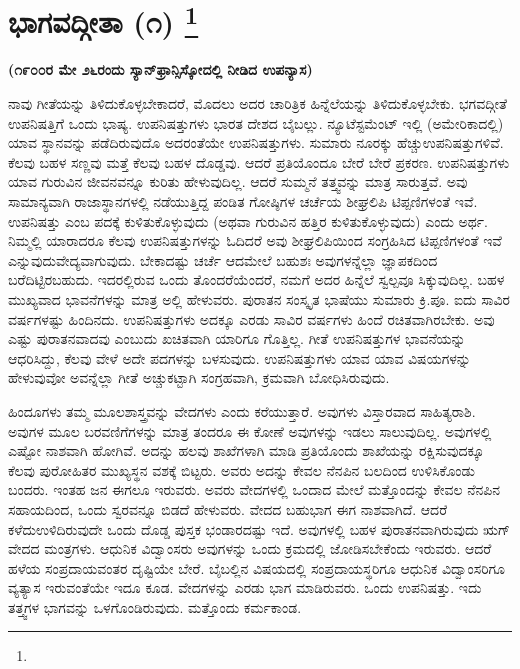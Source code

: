 
\chapter[ಭಾಗವದ್ಗೀತಾ (೧) ]{ಭಾಗವದ್ಗೀತಾ (೧) \protect\footnote{}}

\centerline{\textbf{(೧೯೦೦ರ ಮೇ ೨೬ರಂದು ಸ್ಯಾನ್​ಫ್ರಾನ್ಸಿಸ್ಕೋದಲ್ಲಿ ನೀಡಿದ ಉಪನ್ಯಾಸ)}}

ನಾವು ಗೀತೆಯನ್ನು ತಿಳಿದುಕೊಳ್ಳಬೇಕಾದರೆ, ಮೊದಲು ಅದರ ಚಾರಿತ್ರಿಕ ಹಿನ್ನೆಲೆಯನ್ನು ತಿಳಿದುಕೊಳ್ಳಬೇಕು. ಭಗವದ್ಗೀತೆ ಉಪನಿಷತ್ತಿಗೆ ಒಂದು ಭಾಷ್ಯ. ಉಪನಿಷತ್ತುಗಳು ಭಾರತ ದೇಶದ ಬೈಬಲ್ಲು. ನ್ಯೂಟೆಸ್ಟಮೆಂಟ್​ ಇಲ್ಲಿ (ಅಮೇರಿಕಾದಲ್ಲಿ) ಯಾವ ಸ್ಥಾನವನ್ನು ಪಡೆದಿರುವುದೊ ಅದರಂತೆಯೇ ಉಪನಿಷತ್ತುಗಳು. ಸುಮಾರು ನೂರಕ್ಕು ಹೆಚ್ಚು\break ಉಪನಿಷತ್ತುಗಳಿವೆ. ಕೆಲವು ಬಹಳ ಸಣ್ಣವು ಮತ್ತೆ ಕೆಲವು ಬಹಳ ದೊಡ್ಡವು. ಆದರೆ ಪ್ರತಿಯೊಂದೂ ಬೇರೆ ಬೇರೆ ಪ್ರಕರಣ. ಉಪನಿಷತ್ತುಗಳು ಯಾವ ಗುರುವಿನ ಜೀವನವನ್ನೂ ಕುರಿತು ಹೇಳುವುದಿಲ್ಲ. ಆದರೆ ಸುಮ್ಮನೆ ತತ್ತ್ವವನ್ನು ಮಾತ್ರ ಸಾರುತ್ತವೆ. ಅವು ಸಾಮಾನ್ಯವಾಗಿ ರಾಜಾಸ್ಥಾನಗಳಲ್ಲಿ ನಡೆಯುತ್ತಿದ್ದ ಪಂಡಿತ ಗೋಷ್ಠಿಗಳ ಚರ್ಚೆಯ ಶೀಘ್ರಲಿಪಿ ಟಿಪ್ಪಣಿಗಳಂತೆ ಇವೆ. ಉಪನಿಷತ್ತು ಎಂಬ ಪದಕ್ಕೆ ಕುಳಿತುಕೊಳ್ಳುವುದು (ಅಥವಾ ಗುರುವಿನ ಹತ್ತಿರ ಕುಳಿತುಕೊಳ್ಳುವುದು) ಎಂದು ಅರ್ಥ. ನಿಮ್ಮಲ್ಲಿ ಯಾರಾದರೂ ಕೆಲವು ಉಪನಿಷತ್ತುಗಳನ್ನು ಓದಿದರೆ ಅವು ಶೀಘ್ರಲಿಪಿಯಿಂದ ಸಂಗ್ರಹಿಸಿದ ಟಿಪ್ಪಣಿಗಳಂತೆ ಇವೆ ಎನ್ನುವುದು\break ವೇದ್ಯವಾಗುವುದು. ಬೇಕಾದಷ್ಟು ಚರ್ಚೆ ಆದಮೇಲೆ ಬಹುಶಃ ಅವುಗಳನ್ನೆಲ್ಲಾ ಜ್ಞಾಪಕದಿಂದ ಬರೆದಿಟ್ಟಿರಬಹುದು. ಇದರಲ್ಲಿರುವ ಒಂದು ತೊಂದರೆಯೆಂದರೆ, ನಮಗೆ ಅದರ ಹಿನ್ನೆಲೆ ಸ್ವಲ್ಪವೂ ಸಿಕ್ಕುವುದಿಲ್ಲ. ಬಹಳ ಮುಖ್ಯವಾದ ಭಾವನೆಗಳನ್ನು ಮಾತ್ರ ಅಲ್ಲಿ ಹೇಳುವರು. ಪುರಾತನ ಸಂಸ್ಕೃತ ಭಾಷೆಯು ಸುಮಾರು ಕ್ರಿ.ಪೂ. ಐದು ಸಾವಿರ ವರ್ಷಗಳಷ್ಟು ಹಿಂದಿನದು. ಉಪನಿಷತ್ತುಗಳು ಅದಕ್ಕೂ ಎರಡು ಸಾವಿರ ವರ್ಷಗಳು ಹಿಂದೆ ರಚಿತವಾಗಿರಬೇಕು. ಅವು ಎಷ್ಟು ಪುರಾತನವಾದವು ಎಂಬುದು ಖಚಿತವಾಗಿ ಯಾರಿಗೂ ಗೊತ್ತಿಲ್ಲ. ಗೀತೆ ಉಪನಿಷತ್ತುಗಳ ಭಾವನೆಯನ್ನು ಆಧರಿಸಿದ್ದು, ಕೆಲವು ವೇಳೆ ಅದೇ ಪದಗಳನ್ನು ಬಳಸುವುದು. ಉಪನಿಷತ್ತುಗಳು ಯಾವ ಯಾವ ವಿಷಯಗಳನ್ನು ಹೇಳುವುವೋ ಅವನ್ನೆಲ್ಲಾ ಗೀತೆ ಅಚ್ಚುಕಟ್ಟಾಗಿ ಸಂಗ್ರಹವಾಗಿ, ಕ್ರಮವಾಗಿ ಬೋಧಿಸಿರುವುದು.

ಹಿಂದೂಗಳು ತಮ್ಮ ಮೂಲಶಾಸ್ತ್ರವನ್ನು ವೇದಗಳು ಎಂದು ಕರೆಯುತ್ತಾರೆ. ಅವುಗಳು ವಿಸ್ತಾರವಾದ ಸಾಹಿತ್ಯರಾಶಿ. ಅವುಗಳ ಮೂಲ ಬರವಣಿಗೆಗಳನ್ನು ಮಾತ್ರ ತಂದರೂ ಈ ಕೋಣೆ ಅವುಗಳನ್ನು ಇಡಲು ಸಾಲುವುದಿಲ್ಲ. ಅವುಗಳಲ್ಲಿ ಎಷ್ಟೋ ನಾಶವಾಗಿ ಹೋಗಿವೆ. ಅದನ್ನು ಹಲವು ಶಾಖೆಗಳಾಗಿ ಮಾಡಿ ಪ್ರತಿಯೊಂದು ಶಾಖೆಯನ್ನು ರಕ್ಷಿಸುವುದಕ್ಕೂ ಕೆಲವು ಪುರೋಹಿತರ ಮುಖ್ಯಸ್ಥನ ವಶಕ್ಕೆ ಬಿಟ್ಟರು. ಅವರು ಅದನ್ನು ಕೇವಲ ನೆನಪಿನ ಬಲದಿಂದ ಉಳಿಸಿಕೊಂಡು ಬಂದರು. ಇಂತಹ ಜನ ಈಗಲೂ ಇರುವರು. ಅವರು ವೇದಗಳಲ್ಲಿ ಒಂದಾದ ಮೇಲೆ ಮತ್ತೊಂದನ್ನು ಕೇವಲ ನೆನಪಿನ ಸಹಾಯದಿಂದ, ಒಂದು ಸ್ವರವನ್ನೂ ಬಿಡದೆ ಹೇಳುವರು. ವೇದದ ಬಹುಭಾಗ ಈಗ ನಾಶವಾಗಿದೆ. ಆದರೆ ಕಳೆದು\break ಉಳಿದಿರುವುದೇ ಒಂದು ದೊಡ್ಡ ಪುಸ್ತಕ ಭಂಡಾರದಷ್ಟು ಇದೆ. ಅವುಗಳಲ್ಲಿ ಬಹಳ ಪುರಾತನವಾಗಿರುವುದು ಋಗ್​ ವೇದದ ಮಂತ್ರಗಳು. ಆಧುನಿಕ ವಿದ್ವಾಂಸರು ಅವುಗಳನ್ನು ಒಂದು ಕ್ರಮದಲ್ಲಿ ಜೋಡಿಸಬೇಕೆಂದು ಇರುವರು. ಆದರೆ ಹಳೆಯ ಸಂಪ್ರದಾಯವಂತರ ದೃಷ್ಟಿಯೇ ಬೇರೆ. ಬೈಬಲ್ಲಿನ ವಿಷಯದಲ್ಲಿ ಸಂಪ್ರದಾಯಸ್ಥರಿಗೂ ಆಧುನಿಕ ವಿದ್ವಾಂಸರಿಗೂ ವ್ಯತ್ಯಾಸ ಇರುವಂತೆಯೇ ಇದೂ ಕೂಡ. ವೇದಗಳನ್ನು ಎರಡು ಭಾಗ ಮಾಡಿರುವರು. ಒಂದು ಉಪನಿಷತ್ತು. ಇದು ತತ್ತ್ವಗಳ ಭಾಗವನ್ನು ಒಳಗೊಂಡಿರುವುದು. ಮತ್ತೊಂದು ಕರ್ಮಕಾಂಡ.

